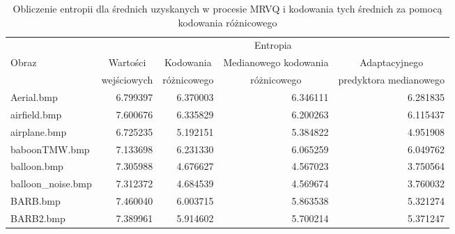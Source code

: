 \documentclass{article}
\begin{document}
\begin{table}[H]
  \caption{Obliczenie entropii dla średnich uzyskanych w procesie MRVQ i kodowania tych średnich za pomocą kodowania różnicowego}
  \label{tab:differential_encoding_all}
  \centering
\begin{adjustbox}{center}
  \begin{tabular}{lrrrr}
    \toprule
    {}                 & \multicolumn{4}{c}{Entropia} \\
    \cmidrule(lr){2-5}
    {Obraz}            & \multicolumn{1}{c}{Wartości} & \multicolumn{1}{c}{Kodowania} & \multicolumn{1}{c}{Medianowego kodowania}  & \multicolumn{1}{c}{Adaptacyjnego} \\
    {}                 & \multicolumn{1}{c}{wejściowych} & \multicolumn{1}{c}{różnicowego}        & \multicolumn{1}{c}{różnicowego} & \multicolumn{1}{c}{predyktora medianowego} \\
    \midrule
    Aerial.bmp         & 6.799397                     & 6.370003                               & 6.346111                                  & 6.281835                                   \\
    airfield.bmp       & 7.600676                     & 6.335829                               & 6.200263                                  & 6.115437                                   \\
    airplane.bmp       & 6.725235                     & 5.192151                               & 5.384822                                  & 4.951908                                   \\
    baboonTMW.bmp      & 7.133698                     & 6.231330                               & 6.065259                                  & 6.049762                                   \\
    balloon.bmp        & 7.305988                     & 4.676627                               & 4.567023                                  & 3.750564                                   \\
    balloon\_noise.bmp & 7.312372                     & 4.684539                               & 4.569674                                  & 3.760032                                   \\
    BARB.bmp           & 7.460040                     & 6.003715                               & 5.863538                                  & 5.321274                                   \\
    BARB2.bmp          & 7.389961                     & 5.914602                               & 5.700214                                  & 5.371247                                   \\

\end{tabular}
\end{adjustbox}
\end{table}
\end{document}
